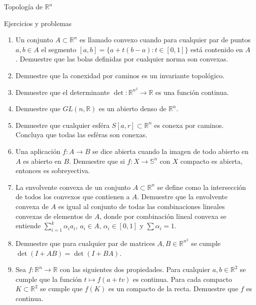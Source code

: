 \begin{chapter}{Topología de $\mathbb{R}^n$}
\begin{section}{Ejercicios y problemas}
\begin{enumerate}
    
    \item Un conjunto $A \subset \mathbb{R}^n$ es llamado convexo cuando para cualquier par de puntos $a, b \in A$ el segmento $[a,b] = \{ a + t(b-a): t \in [0,1] \}$ está contenido en $A$. Demuestre que las bolas definidas por cualquier norma son convexas.
    \item Demuestre que la conexidad por caminos es un invariante topológico.
    \item Demuestre que el determinante $\det: \mathbb{R}^{n^2} \to \mathbb{R}$ es una función continua.
    \item Demuestre que $GL(n, \mathbb{R})$ es un abierto denso de $\mathbb{R}^n$.
    \item Demuestre que cualquier esféra $S[a, r] \subset \mathbb{R}^n$ es conexa por caminos. Concluya que todas las esféras son conexas.
    \item Una aplicación $f:A \to B$ se dice abierta cuando la imagen de todo abierto en $A$ es abierto en $B$. Demuestre que si $f:X \to \mathbb{S}^n$ con $X$ compacto es abierta, entonces es sobreyectiva.
    \item La envolvente convexa de un conjunto $A \subset \mathbb{R}^n$ se define como la intersección de todos los convexos que contienen a $A$. Demuestre que la envolvente convexa de $A$ es igual al conjunto de todas las combinaciones lineales convexas de elementos de $A$, donde por combinación lineal convexa se entiende $\sum_{i=1}^k \alpha_i a_i$, $a_i \in A$, $\alpha_i \in [0,1]$ y $\sum \alpha_i = 1$. 
    \item Demuestre que para cualquier par de matrices $A, B \in \mathbb{R}^{n^2}$ se cumple $\det (I + AB) = \det (I + BA)$.
    \item Sea $f: \mathbb{R}^n \to \mathbb{R}$ con las siguientes dos propiedades. Para cualquier $a,b \in \mathbb{R}^2$ se cumple que la función $t \mapsto f(a + tv)$ es continua. Para cada compacto $K \subset \mathbb{R}^2$ se cumple que $f(K)$ es un compacto de la recta. Demuestre que $f$ es continua.
\end{enumerate}


\end{section}
\end{chapter}
